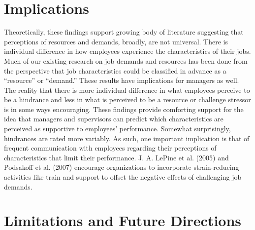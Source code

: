 \documentclass[
  english,
  man]{apa6}
\begin{document}
\hypertarget{implications}{%
\section{Implications}\label{implications}}

Theoretically, these findings support growing body of literature suggesting that perceptions of resources and demands, broadly, are not universal. There is individual difference in how employees experience the characteristics of their jobs. Much of our existing research on job demands and resources has been done from the perspective that job characteristics could be classified in advance as a ``resource'' or ``demand.''
These results have implications for managers as well. The reality that there is more individual difference in what employees perceive to be a hindrance and less in what is perceived to be a resource or challenge stressor is in some ways encouraging. These findings provide comforting support for the idea that managers and supervisors can predict which characteristics are perceived as supportive to employees' performance. Somewhat surprisingly, hindrances are rated more variably. As such, one important implication is that of frequent communication with employees regarding their perceptions of characteristics that limit their performance. J. A. LePine et al. (2005) and Podsakoff et al. (2007) encourage organizations to incorporate strain-reducing activities like train and support to offset the negative effects of challenging job demands.

\hypertarget{limitations-and-future-directions}{%
\section{Limitations and Future Directions}\label{limitations-and-future-directions}}
\end{document}

